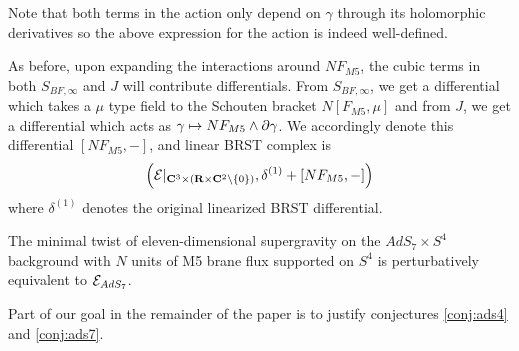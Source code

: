 \documentclass[../main.tex]{subfiles}
\begin{document}
\begin{rmk}
Note that both terms in the action only depend on $\gamma$ through its holomorphic derivatives so the above expression for the action is indeed well-defined. 

As before, upon expanding the interactions around $NF_{M5}$, the cubic terms in both $S_{BF,\infty}$ and $J$ will contribute differentials. From $S_{BF,\infty}$, we get a differential which takes a $\mu$ type field to the Schouten bracket $N[F_{M5}, \mu]$ and from $J$, we get a differential which acts as $\gamma\mapsto N F_{M5} \wedge \partial \gamma$. We accordingly denote this differential $[NF_{M5}, - ] $, and linear BRST complex is
\[
\left (\mathcal{E} |_{\mathbf{C}^3\times (\mathbf{R}\times \mathbf{C}^2\setminus \{0\} )}, \delta^{(1)} + [NF_{M5},-] \right )
\] where $\delta^{(1)}$ denotes the original linearized BRST differential.
\end{rmk}

\begin{conj}\label{conj:ads7}
The minimal twist of eleven-dimensional supergravity on the $AdS_7\times S^4$ background with $N$ units of M5 brane flux supported on $S^4$ is perturbatively equivalent to $\mathcal{E}_{AdS_7}$. 
\end{conj}

Part of our goal in the remainder of the paper is to justify conjectures \ref{conj:ads4} and \ref{conj:ads7}.
\end{document}
